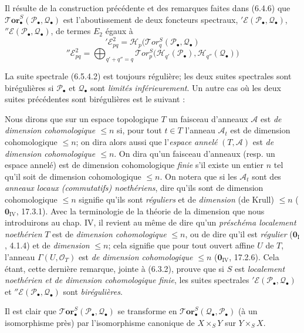 \begin{env}[6.5.4]
Il résulte de la construction précédente et des remarques faites dans (6.4.6)
que $\boldsymbol{\mathscr{T}\!or}_\bullet^S(\mathscr P_\bullet,\mathscr Q_\bullet)$ est
l'aboutissement de deux foncteurs spectraux,
$'\mathscr E(\mathscr P_\bullet,\mathscr Q_\bullet)$,
$''\mathscr E(\mathscr P_\bullet,\mathscr Q_\bullet)$, de termes $E_2$ égaux à
\[
  '\mathscr E_{pq}^2
  =\mathscr H_p\bigl(\mathscr{T}\!or_q^S
    (\mathscr P_\bullet,\mathscr Q_\bullet)
  \tag{6.5.4.1}\label{III.6.5.4.1.fr}
\]
\[
  ''\mathscr E_{pq}^2
  =\bigoplus_{q'+q''=q}
   \mathscr{T}\!or_p^S
   \bigl(\mathscr H_{q'}(\mathscr P_\bullet),
         \mathscr H_{q''}(\mathscr Q_\bullet)\bigr)
  \tag{6.5.4.2}\label{III.6.5.4.2.fr}
\]

La suite spectrale (6.5.4.2) est toujours régulière; les deux suites spectrales
sont birégulières si $\mathscr P_\bullet$ et $\mathscr Q_\bullet$ sont \emph{limités
inférieurement}. Un autre cas où les deux suites précédentes sont birégulières
est le suivant :
\end{env}

\begin{env}[6.5.5]
Nous dirons que sur un espace topologique $T$ un faisceau d'anneaux
$\mathscr A$ est \emph{de dimension cohomologique $\leqslant n$} si, pour tout
$t\in T$ l'anneau $\mathscr A_t$ est de dimension cohomologique $\leqslant n$;
on dira alors aussi que l'\emph{espace annelé} $(T,\mathscr A)$ est
\emph{de dimension cohomologique $\leqslant n$}. On dira qu'un faisceau
d'anneaux (resp. un espace annelé) est de dimension cohomologique \emph{finie}
s'il existe un entier $n$ tel qu'il soit de dimension cohomologique
$\leqslant n$. On notera que si les $\mathscr A_t$ sont des \emph{anneaux locaux
(commutatifs) noethériens},
dire qu'ils sont de dimension cohomologique $\leqslant n$ signifie qu'ils sont
\emph{réguliers} et de \emph{dimension} (de Krull) $\leqslant n$ ($\mathbf{0}_{\mathrm{IV}}$, 17.3.1).
Avec la terminologie de la théorie de la dimension que nous introduirons au
chap. IV, il revient au même de dire qu'un \emph{préschéma localement noethérien} $T$
est de \emph{dimension cohomologique} $\leqslant n$, ou de dire qu'il est \emph{régulier}
($\mathbf{0}_{\mathrm I}$, 4.1.4) et de \emph{dimension} $\leqslant n$; cela signifie que pour
tout ouvert affine $U$ de $T$, l'anneau $\Gamma(U,\mathscr O_T)$ est \emph{de
dimension cohomologique} $\leqslant n$ ($\mathbf{0}_{\mathrm{IV}}$, 17.2.6). Cela étant,
cette dernière remarque, jointe à (6.3.2), prouve que si $S$ est \emph{localement
noethérien et de dimension cohomologique finie}, les suites spectrales
$'\mathscr E(\mathscr P_\bullet,\mathscr Q_\bullet)$ et
$''\mathscr E(\mathscr P_\bullet,\mathscr Q_\bullet)$ sont \emph{birégulières}.

Il est clair que
$\boldsymbol{\mathscr{T}\!or}_\bullet^S(\mathscr P_\bullet,\mathscr Q_\bullet)$ se
transforme en
$\boldsymbol{\mathscr{T}\!or}_\bullet^S(\mathscr Q_\bullet,\mathscr P_\bullet)$ (à un
isomorphisme près) par l'isomorphisme canonique de $X\times_S Y$ sur
$Y\times_S X$.
\end{env}

